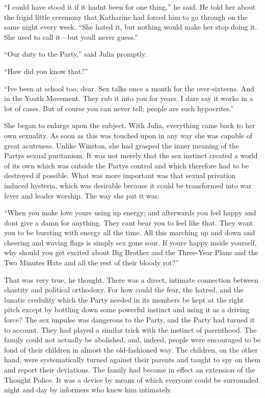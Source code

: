 ``I could have stood it if it hadn\textquotesingle t been for one thing,''
he said. He told her about the frigid little ceremony that Katharine had
forced him to go through on the same night every week. ``She hated it,
but nothing would make her stop doing it. She used to call it---but
you\textquotesingle ll never guess.''

``Our duty to the Party,'' said Julia promptly.

``How did you know that?''

``I\textquotesingle ve been at school too, dear. Sex talks once a month
for the over-sixteens. And in the Youth Movement. They rub it into you
for years. I dare say it works in a lot of cases. But of course you can
never tell; people are such hypocrites.''

She began to enlarge upon the subject. With Julia, everything came back
to her own sexuality. As soon as this was touched upon in any way she
was capable of great acuteness. Unlike Winston, she had grasped the
inner meaning of the Party\textquotesingle s sexual puritanism. It was
not merely that the sex instinct created a world of its own which was
outside the Party\textquotesingle s control and which therefore had to
be destroyed if possible. What was more important was that sexual
privation induced hysteria, which was desirable because it could be
transformed into war fever and leader worship. The way she put it was:

``When you make love you\textquotesingle re using up energy; and
afterwards you feel happy and don\textquotesingle t give a damn for
anything. They can\textquotesingle t bear you to feel like that. They
want you to be bursting with energy all the time. All this marching up
and down and cheering and waving flags is simply sex gone sour. If
you\textquotesingle re happy inside yourself, why should you get excited
about Big Brother and the Three-Year Plans and the Two Minutes Hate and
all the rest of their bloody rot?''

That was very true, he thought. There was a direct, intimate connection
between chastity and political orthodoxy. For how could the fear, the
hatred, and the lunatic credulity which the Party needed in its members
be kept at the right pitch except by bottling down some powerful
instinct and using it as a driving force? The sex impulse was dangerous
to the Party, and the Party had turned it to account. They had played a
similar trick with the instinct of parenthood. The family could not
actually be abolished, and, indeed, people were encouraged to be fond of
their children in almost the old-fashioned way. The children, on the
other hand, were systematically turned against their parents and taught
to spy on them and report their deviations. The family had become in
effect an extension of the Thought Police. It was a device by means of
which everyone could be surrounded night and day by informers who knew
him intimately.


